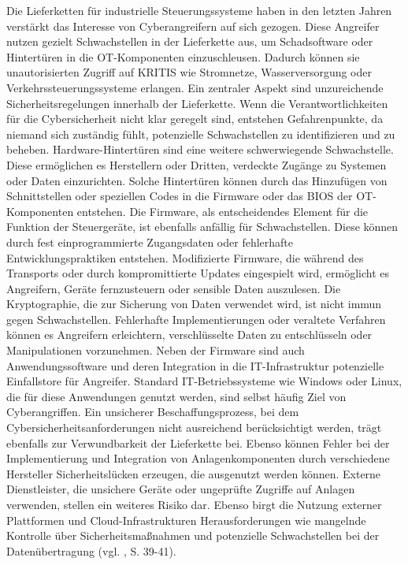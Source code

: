 Die Lieferketten für industrielle Steuerungssysteme haben in den letzten Jahren verstärkt das Interesse von Cyberangreifern auf sich gezogen. Diese Angreifer nutzen gezielt Schwachstellen in der Lieferkette aus, um Schadsoftware oder Hintertüren in die OT-Komponenten einzuschleusen. Dadurch können sie unautorisierten Zugriff auf KRITIS wie Stromnetze, Wasserversorgung oder Verkehrssteuerungssysteme erlangen.
Ein zentraler Aspekt sind unzureichende Sicherheitsregelungen innerhalb der Lieferkette. Wenn die Verantwortlichkeiten für die Cybersicherheit nicht klar geregelt sind, entstehen Gefahrenpunkte, da niemand sich zuständig fühlt, potenzielle Schwachstellen zu identifizieren und zu beheben. Hardware-Hintertüren sind eine weitere schwerwiegende Schwachstelle. Diese ermöglichen es Herstellern oder Dritten, verdeckte Zugänge zu Systemen oder Daten einzurichten. Solche Hintertüren können durch das Hinzufügen von Schnittstellen oder speziellen Codes in die Firmware oder das BIOS der OT-Komponenten entstehen. Die Firmware, als entscheidendes Element für die Funktion der Steuergeräte, ist ebenfalls anfällig für Schwachstellen. \clearpage \noindent Diese können durch fest einprogrammierte Zugangsdaten oder fehlerhafte Entwicklungspraktiken entstehen. Modifizierte Firmware, die während des Transports oder durch kompromittierte Updates eingespielt wird, ermöglicht es Angreifern, Geräte fernzusteuern oder sensible Daten auszulesen. Die Kryptographie, die zur Sicherung von Daten verwendet wird, ist nicht immun gegen Schwachstellen. Fehlerhafte Implementierungen oder veraltete Verfahren können es Angreifern erleichtern, verschlüsselte Daten zu entschlüsseln oder Manipulationen vorzunehmen. Neben der Firmware sind auch Anwendungssoftware und deren Integration in die IT-Infrastruktur potenzielle Einfallstore für Angreifer. Standard IT-Betriebssysteme wie Windows oder Linux, die für diese Anwendungen genutzt werden, sind selbst häufig Ziel von Cyberangriffen. Ein unsicherer Beschaffungsprozess, bei dem Cybersicherheitsanforderungen nicht ausreichend berücksichtigt werden, trägt ebenfalls zur Verwundbarkeit der Lieferkette bei. Ebenso können Fehler bei der Implementierung und Integration von Anlagenkomponenten durch verschiedene Hersteller Sicherheitslücken erzeugen, die ausgenutzt werden können. Externe Dienstleister, die unsichere Geräte oder ungeprüfte Zugriffe auf Anlagen verwenden, stellen ein weiteres Risiko dar. Ebenso birgt die Nutzung externer Plattformen und Cloud-Infrastrukturen Herausforderungen wie mangelnde Kontrolle über Sicherheitsmaßnahmen und potenzielle Schwachstellen bei der Datenübertragung (vgl. \cite{ICS}, S. 39-41).

